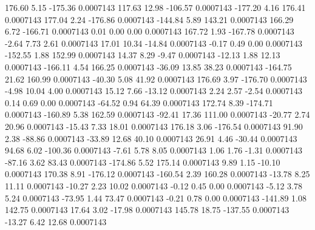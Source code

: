       176.60        5.15     -175.36     0.0007143
      117.63       12.98     -106.57     0.0007143
     -177.20        4.16      176.41     0.0007143
      177.04        2.24     -176.86     0.0007143
     -144.84        5.89      143.21     0.0007143
      166.29        6.72     -166.71     0.0007143
        0.01        0.00        0.00     0.0007143
      167.72        1.93     -167.78     0.0007143
       -2.64        7.73        2.61     0.0007143
       17.01       10.34      -14.84     0.0007143
       -0.17        0.49        0.00     0.0007143
     -152.55        1.88      152.99     0.0007143
       14.37        8.29       -9.47     0.0007143
      -12.13        1.88       12.13     0.0007143
     -166.11        4.54      166.25     0.0007143
      -36.09       13.85       38.23     0.0007143
     -164.75       21.62      160.99     0.0007143
      -40.30        5.08       41.92     0.0007143
      176.69        3.97     -176.70     0.0007143
       -4.98       10.04        4.00     0.0007143
       15.12        7.66      -13.12     0.0007143
        2.24        2.57       -2.54     0.0007143
        0.14        0.69        0.00     0.0007143
      -64.52        0.94       64.39     0.0007143
      172.74        8.39     -174.71     0.0007143
     -160.89        5.38      162.59     0.0007143
      -92.41       17.36      111.00     0.0007143
      -20.77        2.74       20.96     0.0007143
      -15.43        7.33       18.01     0.0007143
      176.18        3.06     -176.54     0.0007143
       91.90        2.38      -88.86     0.0007143
      -33.89       12.68       40.10     0.0007143
       26.91        4.46      -30.44     0.0007143
       94.68        6.02     -100.36     0.0007143
       -7.61        5.78        8.05     0.0007143
        1.06        1.76       -1.31     0.0007143
      -87.16        3.62       83.43     0.0007143
     -174.86        5.52      175.14     0.0007143
        9.89        1.15      -10.10     0.0007143
      170.38        8.91     -176.12     0.0007143
     -160.54        2.39      160.28     0.0007143
      -13.78        8.25       11.11     0.0007143
      -10.27        2.23       10.02     0.0007143
       -0.12        0.45        0.00     0.0007143
       -5.12        3.78        5.24     0.0007143
      -73.95        1.44       73.47     0.0007143
       -0.21        0.78        0.00     0.0007143
     -141.89        1.08      142.75     0.0007143
       17.64        3.02      -17.98     0.0007143
      145.78       18.75     -137.55     0.0007143
      -13.27        6.42       12.68     0.0007143
